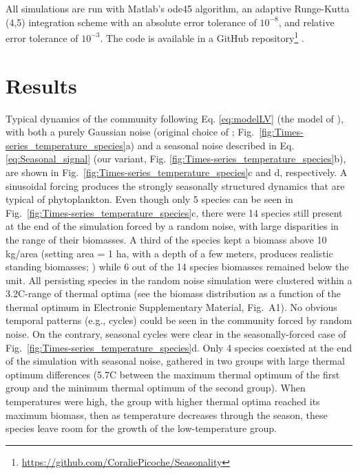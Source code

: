 \documentclass[a4paper,12pt]{article}
\begin{document}
All simulations are run with Matlab's ode45 algorithm, an adaptive
Runge-Kutta (4,5) integration scheme with an absolute error tolerance
of $10^{-8}$, and relative error tolerance of $10^{-3}$. The code
is available in a GitHub repository\footnote{\url{https://github.com/CoraliePicoche/Seasonality}}
.

\section{Results}

Typical dynamics of the community following Eq. \ref{eq:modelLV}
(the model of \citealp{scranton_coexistence_2016}), with both a purely
Gaussian noise (original choice of \citealp{scranton_coexistence_2016};
Fig.~\ref{fig:Times-series_temperature_species}a) and a seasonal
noise described in Eq. \ref{eq:Seasonal_signal} (our variant, Fig.
\ref{fig:Times-series_temperature_species}b), are shown in Fig.~\ref{fig:Times-series_temperature_species}c
and d, respectively. A sinusoidal forcing produces the strongly seasonally
structured dynamics that are typical of phytoplankton. Even though
only 5 species can be seen in Fig.~\ref{fig:Times-series_temperature_species}c,
there were 14 species still present at the end of the simulation forced
by a random noise, with large disparities in the range of their biomasses.
A third of the species kept a biomass above 10 kg/area (setting area
= 1 ha, with a depth of a few meters, produces realistic standing
biomasses; \citealp{reynolds2006ecology}) while 6 out of the 14 species
biomasses remained below the unit. All persisting species in the random
noise simulation were clustered within a 3.2\textdegree C-range of thermal optima
(see the biomass distribution as a function of the thermal optimum
in Electronic Supplementary Material, Fig.~A1). No obvious temporal
patterns (e.g., cycles) could be seen in the community forced by random
noise. On the contrary, seasonal cycles were clear in the seasonally-forced
case of Fig.~\ref{fig:Times-series_temperature_species}d. Only 4
species coexisted at the end of the simulation with seasonal noise,
gathered in two groups with large thermal optimum differences (5.7\textdegree C
between the maximum thermal optimum of the first group and the minimum
thermal optimum of the second group). When temperatures were high,
the group with higher thermal optima reached its maximum biomass,
then as temperature decreases through the season, these species leave
room for the growth of the low-temperature group.
\end{document}
